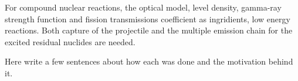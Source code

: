 For compound nuclear reactions, the optical model, level density, gamma-ray strength function and fission transmissions coefficient as ingridients, low energy reactions. Both capture of the projectile and the multiple emission chain for the excited residual nuclides are needed. 










Here write a few sentences about how each was done and the motivation behind it. 

